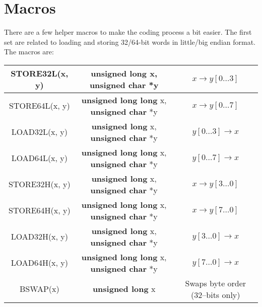 \documentclass[a4paper]{book}
\begin{document}
\section{Macros}

There are a few helper macros to make the coding process a bit easier.  The first set are related to loading and storing
32/64-bit words in little/big endian format.  The macros are:

        
\begin{small}
\begin{center}
\begin{tabular}{|c|c|c|}
     \hline STORE32L(x, y) & {\bf unsigned long} x, {\bf unsigned char} *y & $x \to y[0 \ldots 3]$ \\
     \hline STORE64L(x, y) & {\bf unsigned long long} x, {\bf unsigned char} *y & $x \to y[0 \ldots 7]$ \\
     \hline LOAD32L(x, y) & {\bf unsigned long} x, {\bf unsigned char} *y & $y[0 \ldots 3] \to x$ \\
     \hline LOAD64L(x, y) & {\bf unsigned long long} x, {\bf unsigned char} *y & $y[0 \ldots 7] \to x$ \\
     \hline STORE32H(x, y) & {\bf unsigned long} x, {\bf unsigned char} *y & $x \to y[3 \ldots 0]$ \\
     \hline STORE64H(x, y) & {\bf unsigned long long} x, {\bf unsigned char} *y & $x \to y[7 \ldots 0]$ \\
     \hline LOAD32H(x, y) & {\bf unsigned long} x, {\bf unsigned char} *y & $y[3 \ldots 0] \to x$ \\
     \hline LOAD64H(x, y) & {\bf unsigned long long} x, {\bf unsigned char} *y & $y[7 \ldots 0] \to x$ \\
     \hline BSWAP(x) & {\bf unsigned long} x & Swaps byte order (32--bits only) \\
     \hline
\end{tabular}
\end{center}
\end{small}
\end{document}
